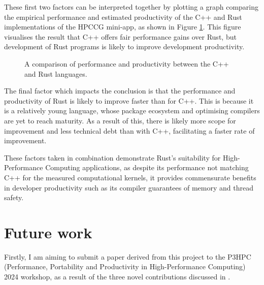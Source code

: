 These first two factors can be interpreted together by plotting a graph comparing the empirical performance and estimated productivity of the C++ and Rust implementations of the HPCCG mini-app, as shown in Figure \ref{fig:conclusions_performance_productivity}. This figure visualises the result that C++ offers fair performance gains over Rust, but development of Rust programs is likely to improve development productivity.

\begin{figure}[H]
    \centering
    
    \caption{A comparison of performance and productivity between the C++ and Rust languages.}
    \label{fig:conclusions_performance_productivity}
\end{figure}


The final factor which impacts the conclusion is that the performance and productivity of Rust is likely to improve faster than for C++. This is because it is a relatively young language, whose package ecosystem and optimising compilers are yet to reach maturity. As a result of this, there is likely more scope for improvement and less technical debt than with C++, facilitating a faster rate of improvement.

These factors taken in combination demonstrate Rust's suitability for High-Performance Computing applications, as despite its performance not matching C++ for the measured computational kernels, it provides commensurate benefits in developer productivity such as its compiler guarantees of memory and thread safety.


\section{Future work}
\label{sec:future-work}

Firstly, I am aiming to submit a paper derived from this project to the P3HPC (Performance, Portability and Productivity in High-Performance Computing) 2024 workshop, as a result of the three novel contributions discussed in .

